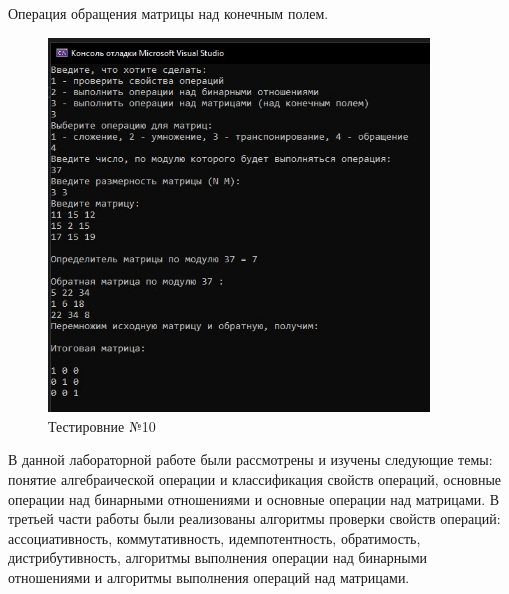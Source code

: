 \documentclass[bachelor, och, labwork]{shiza}
\begin{document}
Операция обращения матрицы над конечным полем.

\begin{figure}[H]
	\centering
	\includegraphics[width=0.9\textwidth]{test_10}
	\caption{Тестировние №10}
	\label{fig:test_10}
\end{figure}
	\newpage
	\conclusion %
	
	В данной лабораторной работе были рассмотрены и изучены следующие темы: понятие алгебраической операции и классификация свойств операций, основные операции над бинарными отношениями и основные операции над матрицами. В третьей части работы были реализованы алгоритмы проверки свойств операций: ассоциативность, коммутативность, идемпотентность, обратимость, дистрибутивность, алгоритмы выполнения операции над бинарными отношениями и алгоритмы выполнения операций над матрицами.  
	  
	
	
	
\end{document}
